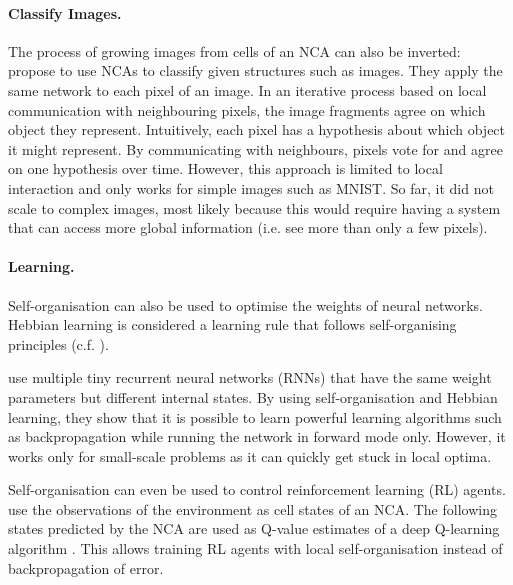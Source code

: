 \paragraph{Classify Images.} The process of growing images from cells of an NCA can also be inverted:
 propose to use NCAs to classify given structures such as images.
They apply the same network to each pixel of an image.
In an iterative process based on local communication with neighbouring pixels, the image fragments agree on which object they represent.
Intuitively, each pixel has a hypothesis about which object it might represent. By communicating with neighbours, pixels vote for and agree on one hypothesis over time.
However, this approach is limited to local interaction and only works for simple images such as MNIST. So far, it did not scale to complex images, most likely because this would require having a system that can access more global information (i.e. see more than only a few pixels).

\paragraph{Learning.} Self-organisation can also be used to optimise the weights of neural networks.
Hebbian learning is considered a learning rule that follows self-organising principles  (c.f. ).

 use multiple tiny recurrent neural networks (RNNs) that have the same weight parameters but different internal states.
By using self-organisation and Hebbian learning, they show that it is possible to learn powerful learning algorithms such as backpropagation while running the network in forward mode only.
However, it works only for small-scale problems as it can quickly get stuck in local optima.

Self-organisation can even be used to control reinforcement learning (RL) agents.
 use the observations of the environment as cell states of an NCA. The following states predicted by the NCA are used as Q-value estimates of a deep Q-learning algorithm . This allows training RL agents with local self-organisation instead of backpropagation of error.


